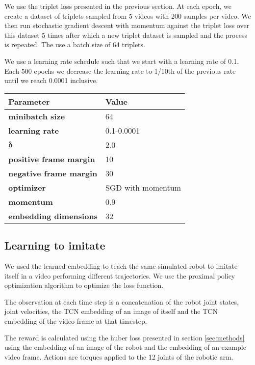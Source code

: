 We use the triplet loss presented in the previous section. At each epoch, we create a dataset of triplets sampled from 5 videos with 200 samples per video. We then run stochastic gradient descent with momentum against the triplet loss over this dataset 5 times after which a new triplet dataset is sampled and the process is repeated. The use a batch size of 64 triplets.

We use a learning rate schedule such that we start with a learning rate of 0.1. Each 500 epochs we decrease the learning rate to 1/10th of the previous rate until we reach 0.0001 inclusive.

{
    \vspace{0.5cm}
    \centering
    \label{cnn-params}
    \begin{tabular}{@{}ll@{}}
    \toprule
    \textbf{Parameter}             & \textbf{Value}    \\ \midrule
    \textbf{minibatch size}        & 64                \\
    \textbf{learning rate}         & 0.1-0.0001        \\
    $\boldsymbol{\delta}$                & 2.0               \\
    \textbf{positive frame margin} & 10                \\
    \textbf{negative frame margin} & 30                \\
    \textbf{optimizer}             & SGD with momentum \\
    \textbf{momentum}              & 0.9               \\
    \textbf{embedding dimensions}  & 32
    \end{tabular}
}

\subsection{Learning to imitate}

We used the learned embedding to teach the same simulated robot to imitate itself in a video performing different trajectories. We use the proximal policy optimization algorithm to optimize the loss function.

The observation at each time step is a concatenation of the robot joint states, joint velocities, the TCN embedding of an image of itself and the TCN embedding of the video frame at that timestep.

The reward is calculated using the huber loss presented in section \ref{sec:methods} using the embedding of an image of the robot and the embedding of an example video frame. Actions are torques applied to the 12 joints of the robotic arm.


